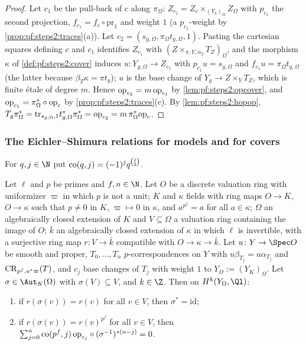 \begin{proof}
Let $c_1$ be the pull-back of $c$ along $\pi_\Omega$: $Z_{c_1}=Z_c\times_{(Y_k)_\Omega}Z_\Omega$ with
$p_{c_1}$ the second projection, $f_{c_1}=f_c\circ\mathrm{pr}_1$ and weight $1$ (a $p_{c_1}$-weight by
\cref{prop:pf:steps2:traces}(a)). Let $c_2=(s_{g,\Omega},\pi_\Omega t_{g,\Omega},1)$. Pasting the
cartesian squares defining $c$ and $c_1$ identifies $Z_{c_1}$ with
$(Z\times_{\pi,Y,\alpha_T}T_Z)_\Omega$, and the morphism $\kappa$ of \cref{def:pf:steps2:cover}
induces $u\colon Y_{g,\Omega}\to Z_{c_1}$ with $p_{c_1}u=s_{g,\Omega}$ and $f_{c_1}u=\pi_\Omega
t_{g,\Omega}$ (the latter because $\beta_T\kappa=\pi t_g$); $u$ is the base change of $Y_g\to
Z\times_YT_Z$, which is finite \'etale of degree $m$. Hence $\mathrm{op}_{c_2}=m\,\mathrm{op}_{c_1}$ by
\cref{lem:pf:steps2:opcover}, and $\mathrm{op}_{c_1}=\pi_\Omega^\ast\circ\mathrm{op}_c$ by
\cref{prop:pf:steps2:traces}(c). By \cref{lem:pf:steps2:hopop},
$T_g\pi_\Omega^\ast=\mathrm{tr}_{s_{g,\Omega},1}t_{g,\Omega}^\ast\pi_\Omega^\ast=\mathrm{op}_{c_2}=
m\,\pi_\Omega^\ast\mathrm{op}_c$.
\end{proof}

\subsubsection{The Eichler--Shimura relations for models and for covers}

For $q,j\in\N$ put $\mathrm{co}(q,j)=(-1)^jq^{\binom j2}$.

\begin{proposition}\label{prop:pf:steps2:esgen}
Let $\ell$ and $p$ be primes and $f,n\in\N$. Let $O$ be a discrete valuation ring with uniformizer
$\varpi$ in which $p$ is not a unit; $K$ and $\kappa$ fields with ring maps $O\to K$, $O\to\kappa$
such that $p\ne0$ in $K$, $\varpi\mapsto0$ in $\kappa$, and $a^{p^f}=a$ for all $a\in\kappa$; $\Omega$ an
algebraically closed extension of $K$ and $V\subseteq\Omega$ a valuation ring containing the image of
$O$; $\bar k$ an algebraically closed extension of $\kappa$ in which $\ell$ is invertible, with a
surjective ring map $r\colon V\to\bar k$ compatible with $O\to\kappa\to\bar k$. Let $u\colon Y\to\Spec
O$ be smooth and proper, $T_0,\dots,T_n$ $p$-correspondences on $Y$ with $u\beta_{T_j}=u\alpha_{T_j}$
and $\mathrm{CR}_{p^f,u^\ast\varpi}(T)$, and $c_j$ base changes of $T_j$ with weight $1$ to
$Y_\Omega:=(Y_K)_\Omega$. Let $\sigma\in\Aut_K(\Omega)$ with $\sigma(V)\subseteq V$, and $k\in\Z$.
Then on $H^k(Y_\Omega,\Ql)$:
\begin{enumerate}[label=\textup{(\alph*)},nosep]
\item if $r(\sigma(v))=r(v)$ for all $v\in V$, then $\sigma^\ast=\mathrm{id}$;
\item if $r(\sigma(v))=r(v)^{p^f}$ for all $v\in V$, then
  $\sum_{j=0}^n\mathrm{co}(p^f,j)\,\mathrm{op}_{c_j}\circ(\sigma^{-1})^{\ast(n-j)}=0$.
\end{enumerate}
\end{proposition}

